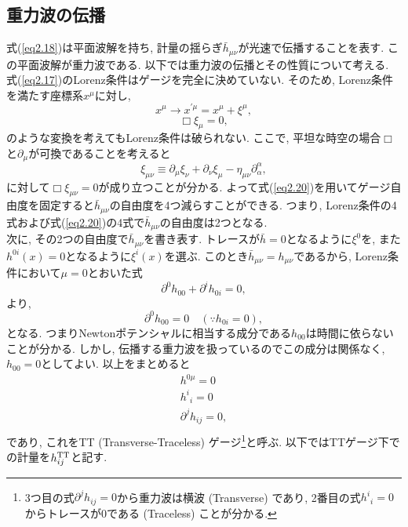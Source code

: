 \subsection{重力波の伝播}
式(\ref{eq2.18})は平面波解を持ち, 計量の揺らぎ$\bar{h}_{\mu\nu}$が光速で伝播することを表す. この平面波解が重力波である. 以下では重力波の伝播とその性質について考える. \\
\quad 式(\ref{eq2.17})のLorenz条件はゲージを完全に決めていない. そのため, Lorenz条件を満たす座標系$x^{\mu}$に対し, 
\begin{equation}
x^{\mu}\rightarrow x^{\prime\mu}=x^{\mu}+\xi^{\mu},
\end{equation}
\begin{equation}
\Box\xi_{\mu}=0,
\label{eq2.20}
\end{equation}
のような変換を考えてもLorenz条件は破られない. ここで, 平坦な時空の場合$\Box$と$\partial_{\mu}$が可換であることを考えると
\begin{equation}
\xi_{\mu\nu}\equiv\partial_{\mu}\xi_{\nu}+\partial_{\nu}\xi_{\mu}-\eta_{\mu\nu}\partial_{\alpha}^{\alpha},
\end{equation}
に対して$\Box\xi_{\mu\nu}=0$が成り立つことが分かる. よって式(\ref{eq2.20})を用いてゲージ自由度を固定すると$\bar{h}_{\mu\nu}$の自由度を4つ減らすことができる. つまり, Lorenz条件の4式および式(\ref{eq2.20})の4式で$\bar{h}_{\mu\nu}$の自由度は2つとなる. \\
\quad 次に, その2つの自由度で$\bar{h}_{\mu\nu}$を書き表す. トレースが$\bar{h}=0$となるように$\xi^{0}$を, また$h^{0i}(x)=0$となるように$\xi^i(x)$を選ぶ. このとき$\bar{h}_{\mu\nu}=h_{\mu\nu}$であるから, Lorenz条件において$\mu=0$とおいた式
\begin{equation}
\partial^0h_{00}+\partial^{i}h_{0i}=0,
\end{equation}
より, 
\begin{equation}
\partial^{0}h_{00}=0\quad (\because h_{0i}=0),
\end{equation}
となる. つまりNewtonポテンシャルに相当する成分である$h_{00}$は時間に依らないことが分かる. しかし, 伝播する重力波を扱っているのでこの成分は関係なく, $h_{00}=0$としてよい. 以上をまとめると
\begin{equation}
\begin{split}
h^{0\mu}=0\\
{h^i}_i=0\\
\partial^jh_{ij}=0,\\
\end{split}
\label{eq2.24}
\end{equation}
であり, これをTT (Transverse-Traceless) ゲージ\footnote{3つ目の式$\partial^jh_{ij}=0$から重力波は横波 (Transverse) であり, 2番目の式${h^i}_i=0$からトレースが0である (Traceless) ことが分かる. }と呼ぶ\cite{19}. 以下ではTTゲージ下での計量を$h_{ij}^{\rm TT}$と記す. \\
